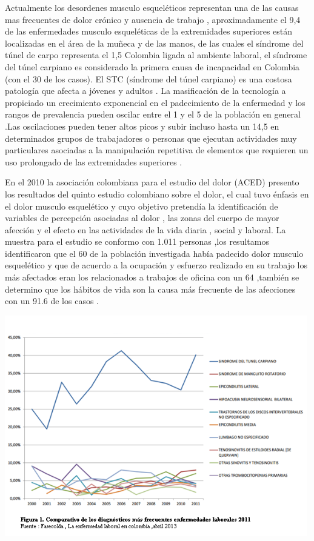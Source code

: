 \documentclass[a4paper,man,natbib]{apa6}
\begin{document}
Actualmente los desordenes musculo esqueléticos representan una de las causas mas frecuentes de dolor crónico y ausencia de trabajo \cite{o1}, aproximadamente el 9,4 de las enfermedades musculo esqueléticas de la extremidades superiores están localizadas en el área de la muñeca y de las manos, de las cuales el síndrome del túnel de carpo representa el 1,5 \cite{o2}Colombia ligada al ambiente laboral, el síndrome del túnel carpiano es considerado la primera causa de incapacidad en Colombia (con el 30 de los casos)\cite{f2}. El STC (síndrome del túnel carpiano) es una costosa patología que afecta a jóvenes y adultos . La masificación de la tecnología a propiciado un crecimiento exponencial en el padecimiento de la enfermedad y los rangos de prevalencia pueden oscilar entre el 1 y el 5 de la población en general .Las oscilaciones pueden tener altos picos y subir incluso hasta un 14,5  en determinados grupos de trabajadores o personas que ejecutan actividades muy particulares asociadas a la manipulación repetitiva de elementos que requieren un uso prolongado de las extremidades superiores \cite{o1}.

En el 2010 la asociación colombiana para el estudio del dolor (ACED) presento los resultados del quinto estudio colombiano sobre el dolor, el cual tuvo énfasis en el dolor musculo esquelético y cuyo objetivo pretendía  la identificación de variables de percepción asociadas al dolor , las zonas del cuerpo de mayor afección y el efecto en las actividades de la vida diaria , social y laboral. La muestra para el estudio se conformo con 1.011 personas ,los resultamos identificaron que el 60 de la población investigada había padecido dolor musculo esquelético y que de acuerdo a la ocupación y esfuerzo realizado en su trabajo los más afectados eran los relacionados a trabajos de oficina con un 64 ,también se determino que los hábitos de vida son la causa más frecuente de las afecciones con un 91.6 de los casos .\cite{o5}

 \includegraphics[width=0.99\textwidth]{grafica_1.png}
 
\end{document}
